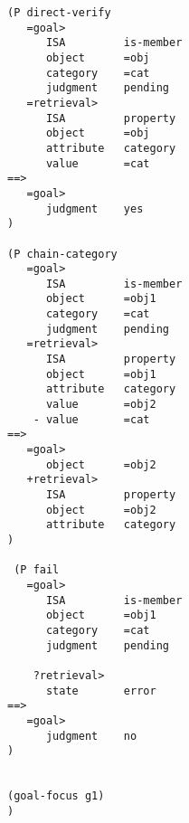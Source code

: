 \begin{lstlisting}[caption={ACT-R production rules for the semantic model}]
(P direct-verify
   =goal>
      ISA         is-member
      object      =obj
      category    =cat
      judgment    pending
   =retrieval>
      ISA         property
      object      =obj
      attribute   category
      value       =cat
==>
   =goal>
      judgment    yes
)

(P chain-category
   =goal>
      ISA         is-member
      object      =obj1
      category    =cat
      judgment    pending
   =retrieval>
      ISA         property
      object      =obj1
      attribute   category
      value       =obj2
    - value       =cat
==>
   =goal>
      object      =obj2
   +retrieval>  
      ISA         property
      object      =obj2
      attribute   category
)

 (P fail
   =goal>
      ISA         is-member
      object      =obj1
      category    =cat  
      judgment    pending
    
    ?retrieval>
      state       error
==>
   =goal>
      judgment    no
)


(goal-focus g1)
)
\end{lstlisting}

